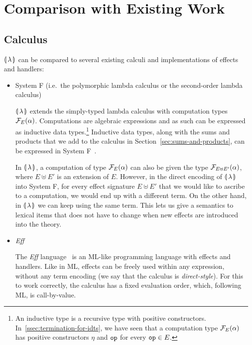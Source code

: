 \section{Comparison with Existing Work}
\label{sec:comparison}

\subsection{Calculus}
\label{ssec:comparison-calculus}

${\llparenthesis \, \lambda \, \rrparenthesis}$ can be compared to several existing calculi and implementations of
effects and handlers:

\begin{itemize}
\item System F (i.e.\ the polymorphic lambda calculus or the second-order
  lambda calculus)

  ${\llparenthesis \, \lambda \, \rrparenthesis}$ extends the simply-typed lambda calculus with computation types
  $\mathcal{F}_E(\alpha)$. Computations are algebraic expressions and as such can
  be expressed as inductive data types.\footnote{An inductive type is a
    recursive type with positive
    constructors. In~\ref{ssec:termination-for-idts}, we have seen that a
    computation type $\mathcal{F}_E(\alpha)$ has positive constructors $\eta$ and
    $\mathtt{op}$ for every $\mathtt{op} \in E$.} Inductive data types, along with
  the sums and products that we add to the calculus in
  Section~\ref{sec:sums-and-products}, can be expressed in System
  F~\cite{wadler1990recursive}.

  In ${\llparenthesis \, \lambda \, \rrparenthesis}$, a computation of type $\mathcal{F}_E(\alpha)$ can also be given the
  type $\mathcal{F}_{E \uplus E'}(\alpha)$, where $E \uplus E'$ is an extension of
  $E$. However, in the direct encoding of ${\llparenthesis \, \lambda \, \rrparenthesis}$ into System F, for every
  effect signature $E \uplus E'$ that we would like to ascribe to a
  computation, we would end up with a different term. On the other hand, in
  ${\llparenthesis \, \lambda \, \rrparenthesis}$ we can keep using the same term. This lets us give a semantics to
  lexical items that does not have to change when new effects are
  introduced into the theory.

\item \emph{Eff}

  The \emph{Eff} language~\cite{bauer2012programming} is an ML-like
  programming language with effects and handlers. Like in ML, effects can
  be freely used within any expression, without any term encoding (we say
  that the calculus is \emph{direct-style}). For this to work correctly,
  the calculus has a fixed evaluation order, which, following ML, is
  call-by-value.


\end{itemize}
